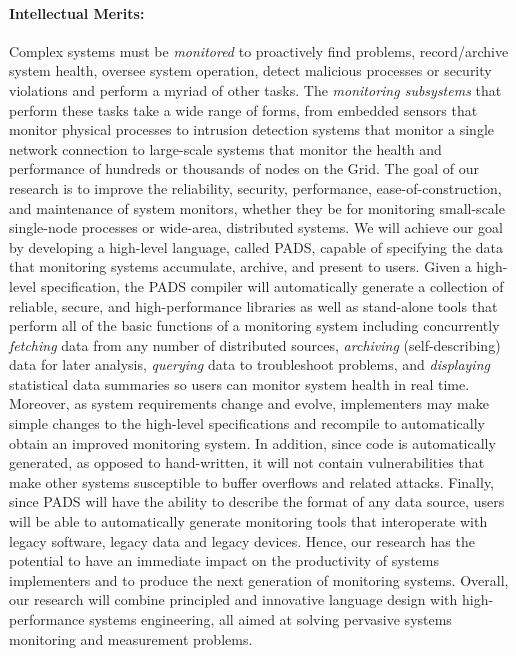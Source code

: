 
\paragraph*{Intellectual Merits:} 
Complex systems must be {\em monitored} to proactively find problems,
record/archive system health, oversee system operation, detect
malicious processes or security violations and perform a myriad of other tasks.
The {\em monitoring subsystems} 
that perform these tasks take a wide range of forms, 
from embedded sensors that monitor physical processes to
intrusion detection systems that monitor a single network connection
to large-scale systems
that monitor the health and performance of hundreds or thousands of nodes
on the Grid.  
The goal of our research is to improve the reliability, security,
performance, ease-of-construction, and maintenance of system monitors, 
whether they
be for monitoring small-scale single-node processes or wide-area, 
distributed systems.  We will achieve our goal by developing a 
high-level language, called PADS, capable of specifying
the data that monitoring systems accumulate, 
archive, and present to users.  Given a high-level specification,
the PADS compiler will automatically generate a collection of
reliable, secure, and high-performance libraries as well as stand-alone
tools that perform all of the basic functions of a monitoring system
including concurrently {\em fetching} data from any number of distributed
sources, {\em archiving} (self-describing) data for later analysis,
{\em querying} data to troubleshoot problems, and {\em displaying}
statistical data summaries so users can monitor system health in real time.
Moreover, as system requirements change and evolve, implementers may make
simple changes to the high-level specifications and recompile to 
automatically obtain an improved monitoring system.  In addition,
since code is automatically generated, as opposed to hand-written, 
it will not contain vulnerabilities
that make other systems susceptible to buffer overflows and related attacks.  
Finally, since
PADS will have the ability to describe the format of 
any data source, users will be able
to automatically generate monitoring tools that interoperate with
legacy software, legacy data and legacy devices.  
Hence, our
research has the potential to have an immediate impact on the productivity of
systems implementers and to produce the next generation of monitoring systems.
Overall, our research will combine principled and innovative language design 
with high-performance systems engineering, all aimed at solving
pervasive systems monitoring and measurement problems.

